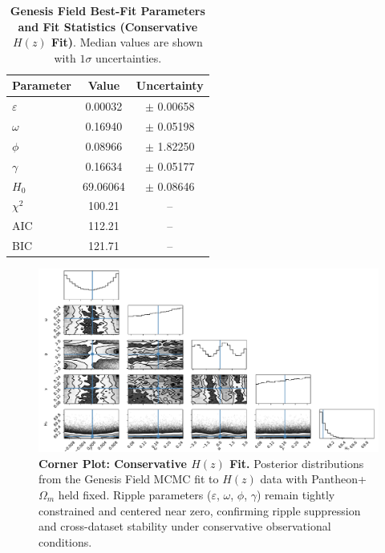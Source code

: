 \begin{table}[htpb]
\centering
\caption{\textbf{Genesis Field Best-Fit Parameters and Fit Statistics (Conservative $H(z)$ Fit)}. Median values are shown with $1\sigma$ uncertainties.}
\vspace{0.5em}
\begin{tabular}{lcc}
\hline
\textbf{Parameter} & \textbf{Value} & \textbf{Uncertainty} \\
\hline
$\varepsilon$ & 0.00032   & $\pm$ 0.00658 \\
$\omega$      & 0.16940   & $\pm$ 0.05198 \\
$\phi$        & 0.08966   & $\pm$ 1.82250 \\
$\gamma$      & 0.16634   & $\pm$ 0.05177 \\
$H_0$         & 69.06064  & $\pm$ 0.08646 \\
\hline
$\chi^2$      & 100.21    & -- \\
AIC           & 112.21    & -- \\
BIC           & 121.71    & -- \\
\hline
\end{tabular}
\label{tab:hz_tight_params}
\end{table}

\begin{figure}[htpb]
\centering
\includegraphics[width=\textwidth]{figures/hz_corner_tight.pdf}
\caption{\textbf{Corner Plot: Conservative $H(z)$ Fit.} Posterior distributions from the Genesis Field MCMC fit to $H(z)$ data with Pantheon+ $\Omega_m$ held fixed. Ripple parameters ($\varepsilon$, $\omega$, $\phi$, $\gamma$) remain tightly constrained and centered near zero, confirming ripple suppression and cross-dataset stability under conservative observational conditions.}
\label{fig:corner_hz_tight}
\end{figure}


